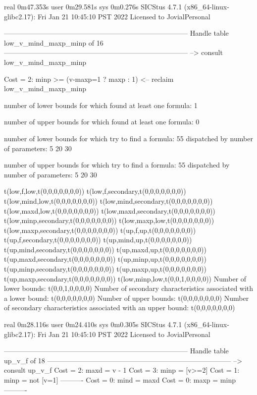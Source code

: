real	0m47.353s
user	0m29.581s
sys	0m0.276s
SICStus 4.7.1 (x86_64-linux-glibc2.17): Fri Jan 21 10:45:10 PST 2022
Licensed to JovialPersonal


--------------------------------------------------------------------------------
Handle table low_v_mind_maxp_minp of 16
--------------------------------------------------------------------------------
--> consult low_v_mind_maxp_minp

Cost =  2:  minp >= (v-maxp=1 ? maxp : 1)
<-- reclaim low_v_mind_maxp_minp

number of lower bounds for which found at least one formula: 1

number of upper bounds for which found at least one formula: 0

number of lower bounds for which try to find a formula: 55
dispatched by number of parameters: 5  20  30

number of upper bounds for which try to find a formula: 55
dispatched by number of parameters: 5  20  30

t(low,f,low,t(0,0,0,0,0,0,0))
t(low,f,secondary,t(0,0,0,0,0,0,0))
t(low,mind,low,t(0,0,0,0,0,0,0))
t(low,mind,secondary,t(0,0,0,0,0,0,0))
t(low,maxd,low,t(0,0,0,0,0,0,0))
t(low,maxd,secondary,t(0,0,0,0,0,0,0))
t(low,minp,secondary,t(0,0,0,0,0,0,0))
t(low,maxp,low,t(0,0,0,0,0,0,0))
t(low,maxp,secondary,t(0,0,0,0,0,0,0))
t(up,f,up,t(0,0,0,0,0,0,0))
t(up,f,secondary,t(0,0,0,0,0,0,0))
t(up,mind,up,t(0,0,0,0,0,0,0))
t(up,mind,secondary,t(0,0,0,0,0,0,0))
t(up,maxd,up,t(0,0,0,0,0,0,0))
t(up,maxd,secondary,t(0,0,0,0,0,0,0))
t(up,minp,up,t(0,0,0,0,0,0,0))
t(up,minp,secondary,t(0,0,0,0,0,0,0))
t(up,maxp,up,t(0,0,0,0,0,0,0))
t(up,maxp,secondary,t(0,0,0,0,0,0,0))
t(low,minp,low,t(0,0,1,0,0,0,0))
Number of lower bounds:                                             t(0,0,1,0,0,0,0)
Number of secondary characteristics associated with a lower bound:  t(0,0,0,0,0,0,0)
Number of upper bounds:                                             t(0,0,0,0,0,0,0)
Number of secondary characteristics associated with an upper bound: t(0,0,0,0,0,0,0)

real	0m28.116s
user	0m24.410s
sys	0m0.305s
SICStus 4.7.1 (x86_64-linux-glibc2.17): Fri Jan 21 10:45:10 PST 2022
Licensed to JovialPersonal


--------------------------------------------------------------------------------
Handle table up_v_f of 18
--------------------------------------------------------------------------------
--> consult up_v_f
Cost =  2:  maxd = v - 1
Cost =  3:  minp = [v>=2]
Cost =  1:  minp = not [v=1]
----------
Cost =  0:  mind = maxd
Cost =  0:  maxp = minp
----------

